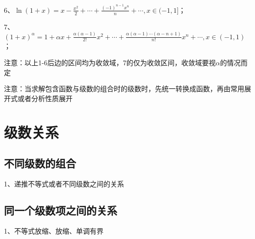 6、$\ln (1+x)=x-\frac{x^{2}}{2}+\cdots+\frac{(-1)^{n-1} x^{n}}{n}+\cdots, x \in(-1,1]$；

7、$(1+x)^{\alpha}=1+\alpha x+\frac{\alpha(\alpha-1)}{2 !} x^{2}+\cdots+\frac{\alpha(\alpha-1) \cdots(\alpha-n+1)}{n !} x^{n}+\cdots, x \in(-1,1)$；

注意：以上1-6后边的区间均为收敛域，7的仅为收敛区间，收敛域要视$\alpha$的情况而定

注意：当求解包含函数与级数的组合时的级数时，先统一转换成函数，再由常用展开式或者分析性质展开

\section{级数关系}



\subsection{不同级数的组合}

1、递推不等式或者不同级数之间的关系



\subsection{同一个级数项之间的关系}

1、不等式放缩、放缩、单调有界

